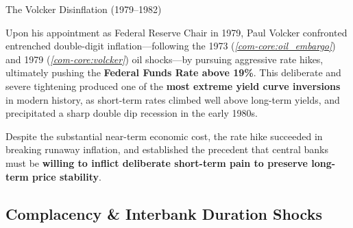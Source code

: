 \documentclass[10pt]{article}
\begin{document}
    \begin{core}[label=core:fixed_volcker]{The Volcker Disinflation (1979--1982)}

      Upon his appointment as Federal Reserve Chair in 1979, Paul Volcker confronted entrenched double-digit inflation---following the 1973 (\textit{\autoref{com-core:oil_embargo}}) and 1979 (\textit{\autoref{com-core:volcker}}) oil shocks---by pursuing aggressive rate hikes, ultimately pushing the \textbf{Federal Funds Rate above 19\%}. This deliberate and severe tightening produced one of the \textbf{most extreme yield curve inversions} in modern history, as short-term rates climbed well above long-term yields, and precipitated a sharp double dip recession in the early 1980s. 


      Despite the substantial near-term economic cost, the rate hike succeeded in breaking runaway inflation, and established the precedent that central banks must be \textbf{willing to inflict deliberate short-term pain to preserve long-term price stability}.

    \end{core}

  \subsection{Complacency \& Interbank Duration Shocks}
\end{document}
